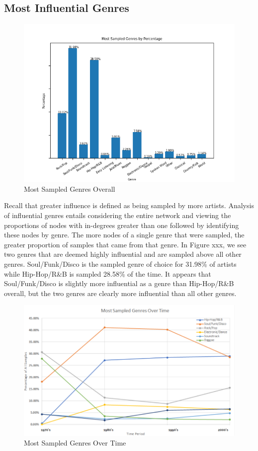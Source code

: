 \documentclass[pageno]{jpaper}
\begin{document}
\subsection{Most Influential Genres}
\begin{figure}[H]
\includegraphics{topSampledGenresPercent}
\caption{Most Sampled Genres Overall}
\centering
\end{figure}
Recall that greater influence is defined as being sampled by more artists. Analysis of influential genres entails considering the entire network and viewing the proportions of nodes with in-degrees greater than one followed by identifying these nodes by genre. The more nodes of a single genre that were sampled, the greater proportion of samples that came from that genre. In Figure xxx, we see two genres that are deemed highly influential and are sampled above all other genres. Soul/Funk/Disco is the sampled genre of choice for 31.98\% of artists while Hip-Hop/R\&B is sampled 28.58\% of the time. It appears that Soul/Funk/Disco is slightly more influential as a genre than Hip-Hop/R\&B overall, but the two genres are clearly more influential than all other genres.
\begin{figure}[H]
\includegraphics{./TimePeriods/mostSampledPlot}
\caption{Most Sampled Genres Over Time}
\centering
\end{figure}
\end{document}
